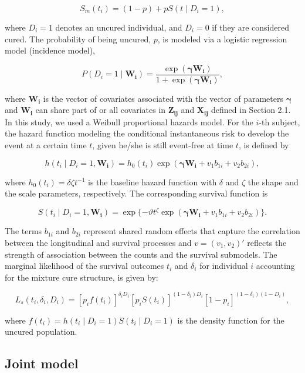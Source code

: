 \documentclass[twoside]{article}
\begin{document}
\[
S_m(t_i) = (1 - p) + p S(t \mid D_i = 1),
\]

where \( D_i = 1 \) denotes an uncured individual, and \( D_i = 0 \) if they are considered cured. The probability of being uncured, \( p \), is modeled via a logistic regression model (incidence model),

\[
P(D_i = 1 \mid \bm{W_i}) = \frac{\exp(\bm{\gamma} \bm{W_i})}{1 + \exp(\bm{\gamma} \bm{W_i})},
\]

where \( \bm{W_i} \) is the vector of covariates associated with the vector of parameters \( \bm{\gamma} \) and \( \bm{W_i} \) can share part of or all covariates in \( \bm{Z_{ij}} \) and \( \bm{X_{ij}} \) defined in Section 2.1. In this study, we used a Weibull proportional hazards model. For the \( i \)-th subject, the hazard function modeling the conditional instantaneous risk to develop the event at a certain time \( t \), given he/she is still event-free at time \( t \), is defined by \cite{Collett:2023}

\begin{equation}
h(t_i \mid D_i = 1, \bm{W_i}) = h_0(t_i) \exp(\bm{\gamma} \bm{W_i} + v_1 b_{1i} + v_2 b_{2i}), 
\end{equation}

where \( h_0(t_i) = \delta \zeta t^{-1} \) is the baseline hazard function with \( \delta \) and \( \zeta \) the shape and the scale parameters, respectively. The corresponding survival function is

\[
S(t_i \mid D_i = 1, \bm{W_i}) = \exp\{-\vartheta t^{\zeta} \exp(\bm{\gamma} \bm{W_i} + v_1 b_{1i} + v_2 b_{2i})\}.
\]


The terms \( b_{1i} \) and \( b_{2i} \) represent shared random effects that capture the correlation between the longitudinal and survival processes and \( v = (v_1, v_2)' \) reflects the strength of association between the counts and the survival submodels. The marginal likelihood of the survival outcomes \( t_i \) and \( \delta_i \) for individual \( i \) accounting for the mixture cure structure, is given by:

\[
L_s(t_i, \delta_i, D_i) = [p_i f(t_i)]^{\delta_i D_i} [p_i S(t_i)]^{(1-\delta_i) D_i} [1 - p_i]^{(1-\delta_i)(1-D_i)},
\]

where \( f(t_i) = h(t_i \mid D_i = 1) S(t_i \mid D_i = 1) \) is the density function for the uncured population.
 
\subsection{Joint model}
\end{document}

